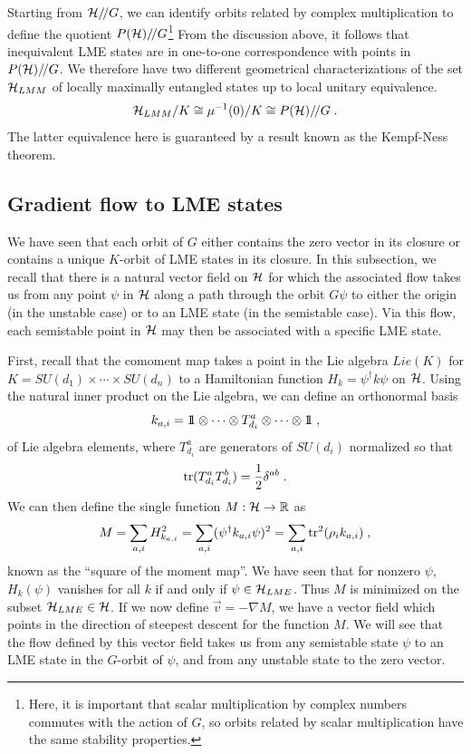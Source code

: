 \documentclass[12pt]{article}
\theoremstyle{definition}
\newcommand{\be}{\begin{equation}}
\newcommand{\ee}{\end{equation}}
\def\identity{{\rlap{1} \hskip 1.6pt \hbox{1}}}
\newcommand{\tr}{{\rm tr}}
\newcommand{\GITquot}{/\!/}
\begin{document}
Starting from ${\cal H}\GITquot G$, we can identify orbits related by complex multiplication to define the quotient $P({\cal H})\GITquot G$\footnote{Here, it is important that scalar multiplication by complex numbers commutes with the action of $G$, so orbits related by scalar multiplication have the same stability properties.} From the discussion above, it follows that inequivalent LME states are in one-to-one correspondence with points in $P({\cal H})\GITquot G$. We therefore have two different geometrical characterizations of the set ${\cal H}_{LMM}$ of locally maximally entangled states up to local unitary equivalence.
\be
{\cal H}_{LMM}/K \cong \mu^{-1}(0)/K \cong P({\cal H})\GITquot G \; .
\ee
The latter equivalence here is guaranteed by a result known as the Kempf-Ness theorem.

\subsection{Gradient flow to LME states}

We have seen that each orbit of $G$ either contains the zero vector in its closure or contains a unique $K$-orbit of LME states in its closure. In this subsection, we recall that there is a natural vector field on ${\cal H}$ for which the associated flow takes us from any point $\psi$ in ${\cal H}$ along a path through the orbit $G \psi$ to either the origin (in the unstable case) or to an LME state (in the semistable case). Via this flow, each semistable point in ${\cal H}$ may then be associated with a specific LME state.

First, recall that the comoment map takes a point in the Lie algebra $Lie(K)$ for $K = SU(d_1) \times \cdots \times SU(d_n)$ to a Hamiltonian function $H_k = \psi^\dagger k \psi$ on ${\cal H}$. Using the natural inner product on the Lie algebra, we can define an orthonormal basis
\be
k_{a,i} = \identity \otimes \cdots \otimes T_{d_i}^a \otimes \cdots \otimes \identity \; ,
\ee
of Lie algebra elements, where $T^a_{d_i}$ are generators of $SU(d_i)$ normalized so that
\be
\tr(T^a_{d_i} T^b_{d_i}) = {1 \over 2} \delta^{a b} \; .
\ee
We can then define the single function $M : {\cal H} \to \mathbb{R}$ as
\be
\label{defM}
M = \sum_{a,i} H^2_{k_{a,i}} = \sum_{a,i} (\psi^\dagger k_{a,i} \psi)^2 = \sum_{a,i} \tr^2(\rho_i k_{a,i})   \; ,
\ee
known as the ``square of the moment map''. We have seen that for nonzero $\psi$, $H_k(\psi)$ vanishes for all $k$ if and only if $\psi \in {\cal H}_{LME}$. Thus $M$ is minimized on the subset ${\cal H}_{LME} \in {\cal H}$. If we now define $\vec{v} = -\nabla M$, we have a vector field which points in the direction of steepest descent for the function $M$. We will see that the flow defined by this vector field takes us from any semistable state $\psi$ to an LME state in the $G$-orbit of $\psi$, and from any unstable state to the zero vector.
\end{document}
